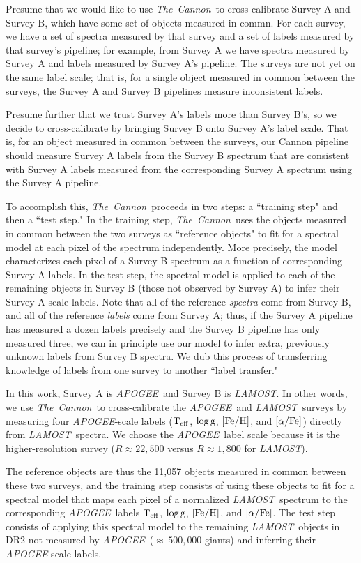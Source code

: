\documentclass[12pt, preprint]{aastex}
\newcommand{\tc}{\textsl{The~Cannon}}
\newcommand{\apogee}{\textsl{APOGEE}}
\newcommand{\lamost}{\textsl{LAMOST}}
\newcommand{\teff}{\mbox{$\rm T_{eff}$}}
\newcommand{\feh}{\mbox{$\rm [Fe/H]$}}
\newcommand{\alphafe}{\mbox{$\rm [\alpha/Fe]$}}
\newcommand{\logg}{\mbox{$\rm \log g$}}
\begin{document}
Presume that we would like to use \tc\ to cross-calibrate Survey A and Survey B,
which have some set of objects measured in commn. 
For each survey, we have a set of spectra measured by that survey 
and a set of labels measured by that survey's pipeline; 
for example, from Survey A we have spectra measured
by Survey A and labels measured by Survey A's pipeline. 
The surveys are not yet on the same label scale; that is,
for a single object measured in common between the surveys, 
the Survey A and Survey B pipelines measure inconsistent labels. 

Presume further that we trust Survey A's labels more than Survey B's, 
so we decide to cross-calibrate
by bringing Survey B onto Survey A's label scale. That is, for an object
measured in common between the surveys, our Cannon pipeline
should measure Survey A labels from the Survey B spectrum that are
consistent with Survey A labels measured from the corresponding 
Survey A spectrum using the Survey A pipeline. 

To accomplish this, \tc\ proceeds in two steps: 
a ``training step" and then a ``test step." 
In the training step, \tc\ uses the objects measured
in common between the two surveys as ``reference objects"
to fit for a spectral model at each pixel of the spectrum independently. 
More precisely, the model characterizes each pixel of a Survey B 
spectrum as a function of corresponding Survey A labels. 
In the test step, the spectral model is applied to each of the remaining objects
in Survey B (those not observed by Survey A) to infer their Survey A-scale labels.
Note that all of the reference \emph{spectra} come from Survey B, 
and all of the reference \emph{labels} come from Survey A; thus, 
if the Survey A pipeline has measured a dozen labels precisely and the 
Survey B pipeline has only measured three, we can in principle use
our model to infer extra, previously unknown labels from Survey B spectra. 
We dub this process of transferring knowledge of labels from one survey
to another ``label transfer." 

In this work, Survey A is \apogee\ and Survey B is \lamost. 
In other words, we use \tc\ to cross-calibrate the \apogee\
and \lamost\ surveys by measuring four \apogee-scale labels
(\teff, \logg, \feh, and \alphafe)
directly from \lamost\ spectra. We choose the \apogee\ label
scale because it is the higher-resolution survey ($R\approx22,500$
versus $R\approx1,800$ for \lamost).

The reference objects are thus the 11,057 objects
measured in common between these two surveys, and the training step consists
of using these objects to fit for a spectral model that maps each pixel of
a normalized \lamost\ spectrum to the corresponding \apogee\ labels 
\teff, \logg, \feh, and \alphafe. 
The test step consists of applying this spectral model to the remaining
\lamost\ objects in DR2 not measured by \apogee\ ($\approx\,500,000$ giants)
and inferring their \apogee-scale labels. 
\end{document}
